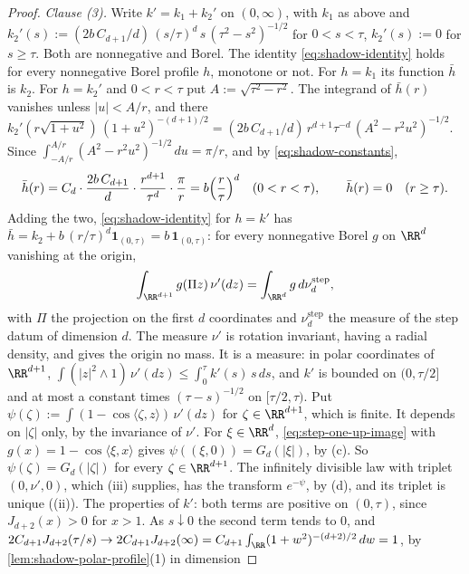 \begin{proof}
\emph{Clause (3).} Write $k' = k_1 + k_2'$ on $(0,\infty)$, with $k_1$ as above and
$k_2'(s) := (2b\,C_{d+1}/d)\,(s/\tau)^d\,s\,(\tau^2 - s^2)^{-1/2}$ for $0 < s < \tau$,
$k_2'(s) := 0$ for $s \ge \tau$. Both are nonnegative and Borel. The identity
\ref{eq:shadow-identity} holds for every nonnegative Borel profile $h$, monotone or not. For
$h = k_1$ its function $\bar h$ is $k_2$. For $h = k_2'$ and $0 < r < \tau$ put
$A := \sqrt{\tau^2 - r^2}$. The integrand of $\bar h(r)$ vanishes unless $|u| < A/r$, and there
$k_2'(r\sqrt{1+u^2})\,(1+u^2)^{-(d+1)/2} = (2b\,C_{d+1}/d)\,r^{d+1}\tau^{-d}\,(A^2 - r^2u^2)^{-1/2}$.
Since $\int_{-A/r}^{A/r}(A^2 - r^2u^2)^{-1/2}\,du = \pi/r$, and by \ref{eq:shadow-constants},
\[
  \bar h(r) = C_d\cdot\frac{2b\,C_{d+1}}{d}\cdot\frac{r^{d+1}}{\tau^{d}}\cdot\frac{\pi}{r}
            = b\Bigl(\frac{r}{\tau}\Bigr)^{d} \quad (0 < r < \tau), \qquad
  \bar h(r) = 0 \quad (r \ge \tau) .
\]
Adding the two, \ref{eq:shadow-identity} for $h = k'$ has $\bar h = k_2 + b\,(r/\tau)^d
\mathbf 1_{(0,\tau)} = b\,\mathbf 1_{(0,\tau)}$: for every nonnegative Borel $g$ on $\RR^d$
vanishing at the origin,
\begin{equation}\label{eq:step-one-up-image}
  \int_{\RR^{d+1}} g(\Pi z)\,\nu'(dz) = \int_{\RR^d} g\,d\nu^{\mathrm{step}}_d ,
\end{equation}
with $\Pi$ the projection on the first $d$ coordinates and $\nu^{\mathrm{step}}_d$ the \Levy{}
measure of the step datum of dimension $d$. The measure $\nu'$ is rotation invariant, having a
radial density, and gives the origin no mass. It is a \Levy{} measure: in polar coordinates of
$\RR^{d+1}$, $\int(|z|^2 \wedge 1)\,\nu'(dz) \le \int_0^\tau k'(s)\,s\,ds$, and $k'$ is bounded
on $(0,\tau/2]$ and at most a constant times $(\tau - s)^{-1/2}$ on $[\tau/2,\tau)$. Put
$\psi(\zeta) := \int(1 - \cos\langle\zeta,z\rangle)\,\nu'(dz)$ for $\zeta \in \RR^{d+1}$, which
is finite. It depends on $|\zeta|$ only, by the invariance of $\nu'$. For $\xi \in \RR^d$,
\ref{eq:step-one-up-image} with $g(x) = 1 - \cos\langle\xi,x\rangle$ gives
$\psi((\xi,0)) = G_d(|\xi|)$, by (c). So $\psi(\zeta) = G_d(|\zeta|)$ for every
$\zeta \in \RR^{d+1}$. The infinitely divisible law with triplet $(0,\nu',0)$, which
(iii) supplies, has the transform $e^{-\psi}$, by (d), and its triplet is unique ((ii)). The properties of $k'$: both terms are
positive on $(0,\tau)$, since $J_{d+2}(x) > 0$ for $x > 1$. As $s \downarrow 0$ the second term
tends to $0$, and $2C_{d+1}J_{d+2}(\tau/s) \to 2C_{d+1}J_{d+2}(\infty)
= C_{d+1}\int_{\RR}(1+w^2)^{-(d+2)/2}\,dw = 1$, by \ref{lem:shadow-polar-profile}(1) in dimension

\end{proof}

